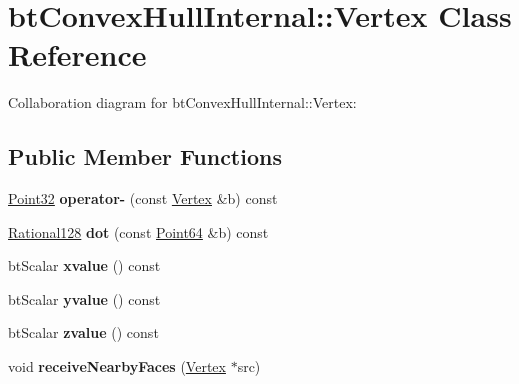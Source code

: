 \hypertarget{classbt_convex_hull_internal_1_1_vertex}{\section{bt\+Convex\+Hull\+Internal\+:\+:Vertex Class Reference}
\label{classbt_convex_hull_internal_1_1_vertex}
}


Collaboration diagram for bt\+Convex\+Hull\+Internal\+:\+:Vertex\+:
\subsection*{Public Member Functions}
\begin{DoxyCompactItemize}
\item 
\hypertarget{classbt_convex_hull_internal_1_1_vertex_afec02649b504517b9e53903e1fe9e61e}{\hyperlink{classbt_convex_hull_internal_1_1_point32}{Point32} {\bfseries operator-\/} (const \hyperlink{classbt_convex_hull_internal_1_1_vertex}{Vertex} \&b) const }\label{classbt_convex_hull_internal_1_1_vertex_afec02649b504517b9e53903e1fe9e61e}

\item 
\hypertarget{classbt_convex_hull_internal_1_1_vertex_a2f21d60ad02493cd4a286f0bffcef194}{\hyperlink{classbt_convex_hull_internal_1_1_rational128}{Rational128} {\bfseries dot} (const \hyperlink{classbt_convex_hull_internal_1_1_point64}{Point64} \&b) const }\label{classbt_convex_hull_internal_1_1_vertex_a2f21d60ad02493cd4a286f0bffcef194}

\item 
\hypertarget{classbt_convex_hull_internal_1_1_vertex_ae279b35480e7776716c2228e727ce8b1}{bt\+Scalar {\bfseries xvalue} () const }\label{classbt_convex_hull_internal_1_1_vertex_ae279b35480e7776716c2228e727ce8b1}

\item 
\hypertarget{classbt_convex_hull_internal_1_1_vertex_a6caf86e290e1ad15e280c43a73d280f5}{bt\+Scalar {\bfseries yvalue} () const }\label{classbt_convex_hull_internal_1_1_vertex_a6caf86e290e1ad15e280c43a73d280f5}

\item 
\hypertarget{classbt_convex_hull_internal_1_1_vertex_a30ba0000c7623b87eb4108d3dc3ba028}{bt\+Scalar {\bfseries zvalue} () const }\label{classbt_convex_hull_internal_1_1_vertex_a30ba0000c7623b87eb4108d3dc3ba028}

\item 
\hypertarget{classbt_convex_hull_internal_1_1_vertex_a584ed968134a9728d686f2732c52089b}{void {\bfseries receive\+Nearby\+Faces} (\hyperlink{classbt_convex_hull_internal_1_1_vertex}{Vertex} $\ast$src)}\label{classbt_convex_hull_internal_1_1_vertex_a584ed968134a9728d686f2732c52089b}

\end{DoxyCompactItemize}
